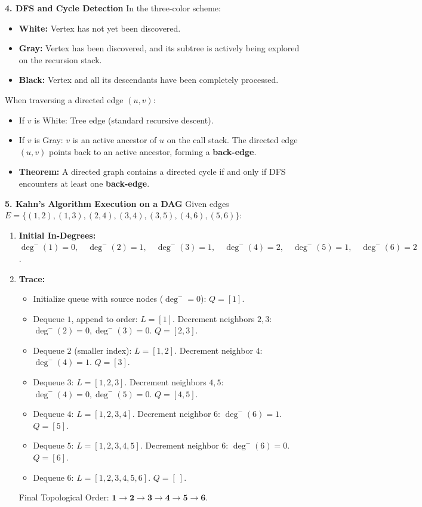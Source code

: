 \textbf{4. DFS and Cycle Detection}
In the three-color scheme:
\begin{itemize}
    \item \textbf{White:} Vertex has not yet been discovered.
    \item \textbf{Gray:} Vertex has been discovered, and its subtree is actively being explored on the recursion stack.
    \item \textbf{Black:} Vertex and all its descendants have been completely processed.
\end{itemize}
When traversing a directed edge $(u, v)$:
\begin{itemize}
    \item If $v$ is White: Tree edge (standard recursive descent).
    \item If $v$ is Gray: $v$ is an active ancestor of $u$ on the call stack. The directed edge $(u, v)$ points back to an active ancestor, forming a \textbf{back-edge}.
    \item \textbf{Theorem:} A directed graph contains a directed cycle if and only if DFS encounters at least one \textbf{back-edge}.
\end{itemize}

\textbf{5. Kahn's Algorithm Execution on a DAG}
Given edges $E = \{(1, 2), (1, 3), (2, 4), (3, 4), (3, 5), (4, 6), (5, 6)\}$:
\begin{enumerate}
    \item \textbf{Initial In-Degrees:}
    $\deg^-(1) = 0, \quad \deg^-(2) = 1, \quad \deg^-(3) = 1, \quad \deg^-(4) = 2, \quad \deg^-(5) = 1, \quad \deg^-(6) = 2$.
    \item \textbf{Trace:}
    \begin{itemize}
        \item Initialize queue with source nodes ($\deg^- = 0$): $Q = [1]$.
        \item Dequeue $1$, append to order: $L = [1]$. Decrement neighbors $2, 3$: $\deg^-(2) = 0, \deg^-(3) = 0$. $Q = [2, 3]$.
        \item Dequeue $2$ (smaller index): $L = [1, 2]$. Decrement neighbor $4$: $\deg^-(4) = 1$. $Q = [3]$.
        \item Dequeue $3$: $L = [1, 2, 3]$. Decrement neighbors $4, 5$: $\deg^-(4) = 0, \deg^-(5) = 0$. $Q = [4, 5]$.
        \item Dequeue $4$: $L = [1, 2, 3, 4]$. Decrement neighbor $6$: $\deg^-(6) = 1$. $Q = [5]$.
        \item Dequeue $5$: $L = [1, 2, 3, 4, 5]$. Decrement neighbor $6$: $\deg^-(6) = 0$. $Q = [6]$.
        \item Dequeue $6$: $L = [1, 2, 3, 4, 5, 6]$. $Q = [\ ]$.
    \end{itemize}
    Final Topological Order: $\mathbf{1 \to 2 \to 3 \to 4 \to 5 \to 6}$.
\end{enumerate}

